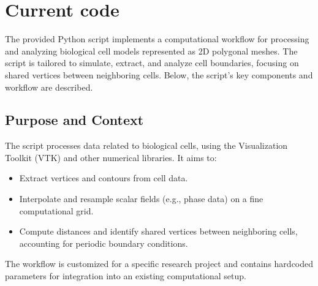 \documentclass[12pt]{article}
\begin{document}
\section{Current code}

The provided Python script implements a computational workflow for processing and analyzing biological cell models represented as 2D polygonal meshes. The script is tailored to simulate, extract, and analyze cell boundaries, focusing on shared vertices between neighboring cells. Below, the script's key components and workflow are described.

\subsection{Purpose and Context}
The script processes data related to biological cells, using the Visualization Toolkit (VTK) and other numerical libraries. It aims to:
\begin{itemize}
    \item Extract vertices and contours from cell data.
    \item Interpolate and resample scalar fields (e.g., phase data) on a fine computational grid.
    \item Compute distances and identify shared vertices between neighboring cells, accounting for periodic boundary conditions.
\end{itemize}

The workflow is customized for a specific research project and contains hardcoded parameters for integration into an existing computational setup.
\end{document}
